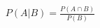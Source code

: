 \documentclass[preview]{standalone}
\begin{document}
\begin{align*}
P(A|B) = \frac{P(A \cap B)}{P(B)}
\end{align*}
\end{document}
